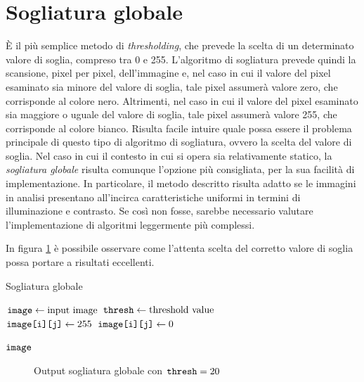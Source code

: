 \section{Sogliatura globale}
\label{sec:image-bin-global}
\`E il pi\`u semplice metodo di \textit{thresholding}, che prevede la scelta di un determinato valore di soglia, compreso tra 0 e 255. L'algoritmo di sogliatura prevede quindi la scansione, pixel per pixel, dell'immagine e, nel caso in cui il valore del pixel esaminato sia minore del valore di soglia, tale pixel assumer\`a valore zero, che corrisponde al colore nero. Altrimenti, nel caso in cui il valore del pixel esaminato sia maggiore o uguale del valore di soglia, tale pixel assumer\`a valore 255, che corrisponde al colore bianco. Risulta facile intuire quale possa essere il problema principale di questo tipo di algoritmo di sogliatura, ovvero la scelta del valore di soglia.
Nel caso in cui il contesto in cui si opera sia relativamente statico, la \textit{sogliatura globale} risulta comunque l'opzione pi\`u consigliata, per la sua facilit\`a di implementazione. In particolare, il metodo descritto risulta adatto se le immagini in analisi presentano all'incirca caratteristiche uniformi in termini di illuminazione e contrasto. Se cos\`i non fosse, sarebbe necessario valutare l'implementazione di algoritmi leggermente pi\`u complessi.\par
In figura \ref{fig:image-bin-global} \`e possibile osservare come l'attenta scelta del corretto valore di soglia possa portare a risultati eccellenti.
\begin{algorithm}
	\caption{Sogliatura globale}
	\label{alg:thresh-global}
	\begin{algorithmic}[1]
			\State $\texttt{image} \gets \text{input image}$
			\State $\texttt{thresh} \gets \text{threshold value}$
			\\
						\State $\texttt{image[i][j]} \gets 255$
					\Else
						\State $\texttt{image[i][j]} \gets 0$
					\EndIf
				\EndFor
			\EndFor

			\Return $\texttt{image}$
		\EndFunction
	\end{algorithmic}
\end{algorithm}
\begin{figure}[H]
	\centering
	\caption{Output sogliatura globale con $\texttt{thresh}=20$}
	\label{fig:image-bin-global}
\end{figure}

